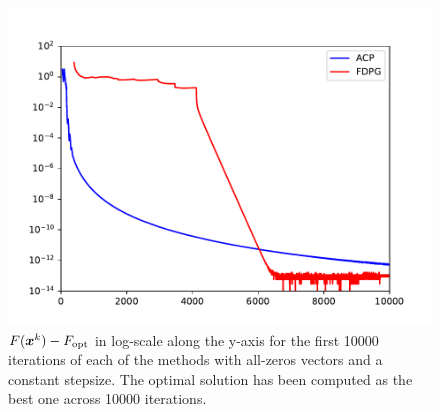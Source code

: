     \begin{figure}[H]
    \centering
    \includegraphics[width=14cm]{images/part3_ex2_fig3.pdf}
    \caption{$F(\boldsymbol x^k)-F_{\text{opt}}$ in log-scale along the 
  y-axis for the first 10000 iterations of each of the methods 
  with all-zeros vectors and a constant stepsize. The optimal solution has been computed as the best one across 10000 iterations. }
  \label{fig:ex6}
\end{figure}